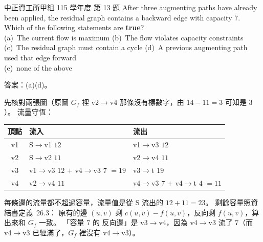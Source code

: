 \begin{pastexam}[label={px:ccu-115-swa-03}]{中正資工所甲組 115 學年度 第 13 題}
After three augmenting paths have already been applied, the residual graph contains a backward edge
with capacity 7.\\
Which of the following statements are \textbf{true}?\\
(a)~The current flow is maximum \qquad (b)~The flow violates capacity constraints\\
(c)~The residual graph must contain a cycle \qquad (d)~A previous augmenting path used that edge
forward\\
(e)~none of the above
\end{pastexam}

\begin{pastsoln}
答案：(a)(d)。

先核對兩張圖（原圖 $G_f$ 裡 v2$\to$v4 那條沒有標數字，由 $14 - 11 = 3$ 可知是 $3$）。 流量守恆：
\begin{center}
\small
\begin{tabular}{cll}
\toprule
頂點 & 流入 & 流出 \\
\midrule
v1 & S$\to$v1 $12$ & v1$\to$v3 $12$ \\
v2 & S$\to$v2 $11$ & v2$\to$v4 $11$ \\
v3 & v1$\to$v3 $12$ $+$ v4$\to$v3 $7$ $= 19$ & v3$\to$t $19$ \\
v4 & v2$\to$v4 $11$ & v4$\to$v3 $7$ $+$ v4$\to$t $4$ $= 11$ \\
\bottomrule
\end{tabular}
\end{center}
每條邊的流量都不超過容量，流量值是從 S 流出的 $12 + 11 = 23$。 剩餘容量照資結書定義~26.3：
原有的邊 $(u, v)$ 剩 $c(u, v) - f(u, v)$，反向剩 $f(u, v)$，算出來和 $G_f$ 一致。 「容量 $7$ 的
反向邊」是 v3$\to$v4，因為 v4$\to$v3 流了 $7$（而 v4$\to$v3 已經滿了，$G_f$ 裡沒有 v4$\to$v3）。


\end{pastsoln}
